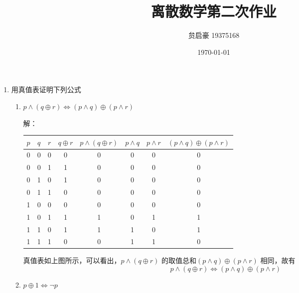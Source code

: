 \documentclass[UTF8]{ctexart}
\title{离散数学第二次作业}
\author{贠启豪 19375168}
\date{\today}
\begin{document}
   \maketitle
    \begin{enumerate}
        \item 用真值表证明下列公式
        \begin{enumerate}
            \item $p\wedge (q\oplus r)\Leftrightarrow (p \wedge q)\oplus (p\wedge r) $
            
            解：
            \begin{table}[H]
                \centering
                \begin{tabular}{|cccccccc|}
                    \hline
                    $p$ & $q$ & $r$ & $q\oplus r$ & $p\wedge (q\oplus r)$ & $p\wedge q$ & $p\wedge r$ & $(p \wedge q)\oplus (p\wedge r)$ \\
                    \hline
                    0 & 0 & 0 & 0 & 0 & 0 & 0 & 0 \\ 
                    \hline
                    0 & 0 & 1 & 1 & 0 & 0 & 0 & 0 \\
                    \hline
                    0 & 1 & 0 & 1 & 0 & 0 & 0 & 0 \\
                    \hline
                    0 & 1 & 1 & 0 & 0 & 0 & 0 & 0 \\
                    \hline
                    1 & 0 & 0 & 0 & 0 & 0 & 0 & 0 \\
                    \hline
                    1 & 0 & 1 & 1 & 1 & 0 & 1 & 1 \\
                    \hline
                    1 & 1 & 0 & 1 & 1 & 1 & 0 & 1 \\
                    \hline
                    1 & 1 & 1 & 0 & 0 & 1 & 1 & 0 \\
                    \hline
                \end{tabular}
            \end{table}
            真值表如上图所示，可以看出，$p\wedge (q\oplus r)$
            的取值总和$(p \wedge q)\oplus (p\wedge r)$
            相同，故有
            \[
                p\wedge (q\oplus r)\Leftrightarrow (p \wedge q)\oplus (p\wedge r)
            \]

            \item $p\oplus 1 \Leftrightarrow \neg p$
            

\end{enumerate}
\end{enumerate}
\end{document}
